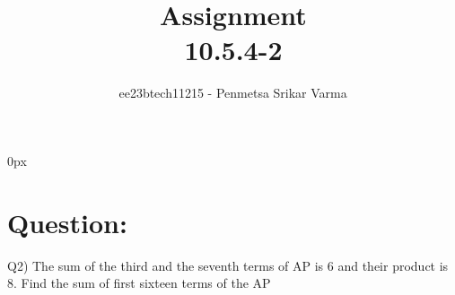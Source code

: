 \documentclass[beamer]{IEEEtran}
\theoremstyle{remark}
\begin{document}
\parindent 0px


\title{Assignment\\[1ex]10.5.4-2}
\author{ee23btech11215 - Penmetsa Srikar Varma$^{}$%
}
\maketitle
\newpage
\bigskip

\renewcommand{\thefigure}{\theenumi}
\renewcommand{\thetable}{\theenumi}
\section*{Question:}
Q2) The sum of the third and the seventh terms of AP is 6 and their product is 8. Find the sum of first sixteen terms of the AP\\
\end{document}
